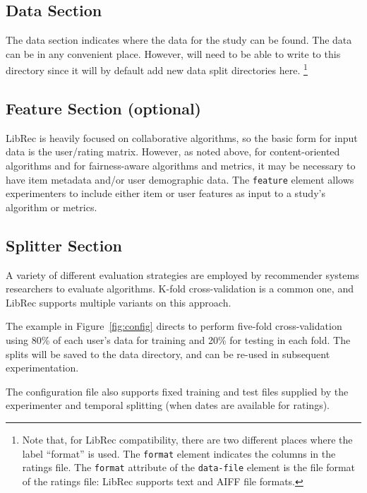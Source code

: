 \subsection{Data Section}
\label{subsec:libauto_data_sec}

The data section indicates where the data for the study can be found. The data can be in any convenient place. However, \libauto{} will need to be able to write to this directory since it will by default add new data split directories here. \footnote{Note that, for LibRec compatibility, there are two different places where the label ``format'' is used. The \texttt{format} element indicates the columns in the ratings file. The \texttt{format} attribute of the \texttt{data-file} element is the file format of the ratings file: LibRec supports text and AIFF file formats.}

\subsection{Feature Section (optional)}
\label{subsec:libauto_feature_selection}

LibRec is heavily focused on collaborative algorithms, so the basic form for input data is the user/rating matrix. However, as noted above, for content-oriented algorithms and for fairness-aware algorithms and metrics, it may be necessary to have item metadata and/or user demographic data. The \texttt{feature} element allows experimenters to include either item or user features as input to a study's algorithm or metrics. 

\subsection{Splitter Section}
\label{subsec:libauto_splitter}
A variety of different evaluation strategies are employed by recommender systems researchers to evaluate algorithms. K-fold cross-validation is a common one, and LibRec supports multiple variants on this approach. 

The example in Figure~\ref{fig:config} directs \libauto{} to perform five-fold cross-validation using 80\% of each user's data for training and 20\% for testing in each fold. The splits will be saved to the data directory, and can be re-used in subsequent experimentation. 

The configuration file also supports fixed training and test files supplied by the experimenter and temporal splitting (when dates are available for ratings). 

